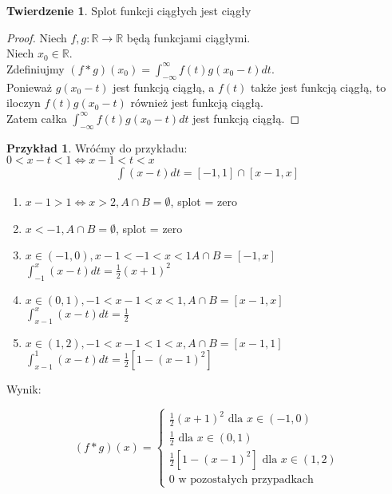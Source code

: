 \documentclass{article}
\theoremstyle{definition}
\theoremstyle{definition}
\newtheorem{tw}{Twierdzenie}[subsection]
\theoremstyle{definition}
\newtheorem{pk}{Przykład}[subsection]
\theoremstyle{definition}
\begin{document}
\begin{tw}
    Splot funkcji ciągłych jest ciągły
\end{tw}

\begin{proof}
    Niech $f,g: \mathbb{R}\rightarrow \mathbb{R}$ będą funkcjami ciągłymi.\\
    Niech $x_0\in\mathbb{R}$.\\
    Zdefiniujmy $(f*g)(x_0) = \int_{-\infty}^{\infty} f(t)g(x_0-t) dt$.\\
    Ponieważ $g(x_0-t)$ jest funkcją ciągłą, a $f(t)$ także jest funkcją ciągłą, to iloczyn $f(t)g(x_0-t)$ również jest funkcją ciągłą.\\
    Zatem całka $\int_{-\infty}^{\infty} f(t)g(x_0-t) dt$ jest funkcją ciągłą.
\end{proof}

\begin{pk}
    Wróćmy do przykładu:\\
    $0<x-t<1 \iff x-1<t<x$\\
    \begin{align}
        \int (x-t) dt = [-1,1] \cap [x-1,x]
    \end{align}
    \begin{enumerate}
        \item $x-1>1 \iff x>2, A\cap B = \emptyset$, splot = zero
        \item $x<-1, A\cap B=\emptyset$, splot = zero
        \item $x\in(-1,0), x-1<-1<x<1 A\cap B=[-1,x]$\\
        $\int_{-1}^{x} (x-t) dt = \frac{1}{2} (x+1)^2$
        \item $x\in(0,1), -1<x-1<x<1, A\cap B=[x-1,x]$\\
        $\int_{x-1}^{x} (x-t) dt = \frac{1}{2}$
        \item $x\in(1,2), -1<x-1<1<x, A\cap B=[x-1,1]$\\
        $\int_{x-1}^{1} (x-t) dt = \frac{1}{2} \left[1-(x-1)^2\right]$
    \end{enumerate}
    Wynik:
    \begin{center}
        $$
        (f*g)(x)=
        \begin{cases}
            \frac{1}{2} (x+1)^2 \text{ dla } x\in(-1,0)\\
            \frac{1}{2} \text{ dla } x\in(0,1)\\
            \frac{1}{2} \left[1-(x-1)^2\right] \text{ dla } x\in(1,2)\\
            0 \text{ w pozostałych przypadkach}
        \end{cases}
        $$
    \end{center}
\end{pk}
\end{document}
